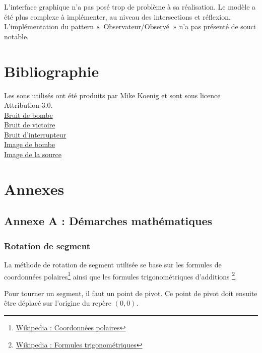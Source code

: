 \documentclass[]{report}
\begin{document}
L’interface graphique n’a pas posé trop de problème à sa réalisation. Le modèle a été plus complexe à implémenter, au niveau des intersections et réflexion. L’implémentation du pattern «~Observateur/Observé~» n’a pas présenté de souci notable.

\section{Bibliographie}

Les sons utilisés ont été produits par Mike Koenig et sont sous licence Attribution 3.0.\\

\href{http://soundbible.com/106-Car-Explosion.html}{Bruit de bombe}   \\
\href{http://soundbible.com/1003-Ta-Da.html}{Bruit de victoire}       \\
\href{http://soundbible.com/761-Switch.html}{Bruit d’interrupteur}    \\
\href{http://pixabay.com/static/uploads/photo/2014/04/02/10/26/nuclear-303831\_640.png}{Image de bombe} \\
\href{http://www.clipartpanda.com/clipart_images/light-bulb-clip-art-28827349}{Image de la source} \\


\newpage
\section{\label{Annexe}Annexes}

\subsection{Annexe A : Démarches mathématiques}

\subsubsection{\label{AnnexeRotation}Rotation de segment}

La méthode de rotation de segment utilisée se base sur les formules
de coordonnées polaires\footnote{\href{http://fr.wikipedia.org/wiki/Coordonn\%C3\%A9es\_polaires}{Wikipedia : Coordonnées polaires}}
ainsi que les formules trigonométriques d'additions
\footnote{\href{http://fr.wikipedia.org/wiki/Trigonom\%C3\%A9trie}{Wikipedia : Formules trigonométriques}}.

Pour tourner un segment, il faut un point de pivot. Ce point de pivot
doit ensuite être déplacé sur l'origine du repère $ (0, 0) $.
\end{document}
